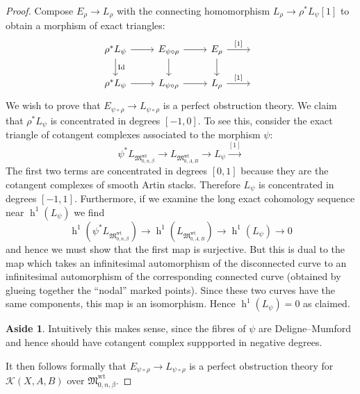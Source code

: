 \documentclass[11pt]{amsart}
\renewcommand{\to}{\rightarrow}
\newcommand{\MM}{\mathfrak M}
\newcommand{\Id}{\operatorname{Id}}
\newcommand{\h}{\operatorname{h}}
\theoremstyle{plain}
\theoremstyle{definition}
\newtheorem{aside}[thm]{Aside}
\begin{document}
\begin{proof} Compose $E_\rho \to L_\rho$ with the connecting homomorphism $L_\rho \to \rho^* L_\psi[1]$ to obtain a morphism of exact triangles:
\begin{equation} \label{E rho and E psi rho diagram}
\begin{tikzcd}
\rho^* L_\psi \ar[d,"\Id"] \ar[r] & E_{\psi \circ \rho} \ar[r] \ar[d] & E_\rho \ar[r,"{[1]}"] \ar[d] & \, \\
\rho^* L_\psi \ar[r] & L_{\psi \circ \rho} \ar[r] & L_\rho \ar[r,"{[1]}"] & \,
\end{tikzcd}
\end{equation}
We wish to prove that $E_{\psi \circ \rho} \to L_{\psi \circ \rho}$ is a perfect obstruction theory. We claim that $\rho^* L_{\psi}$ is concentrated in degrees $[-1,0]$. To see this, consider the exact triangle of cotangent complexes associated to the morphism $\psi$:
\begin{equation*} \psi^* L_{\MM_{0,n,\beta}^{\operatorname{wt}}} \to L_{\MM_{0,A,B}^{\operatorname{wt}}} \to L_\psi \xrightarrow{[1]} \end{equation*}
The first two terms are concentrated in degrees $[0,1]$ because they are the cotangent complexes of smooth Artin stacks. Therefore $L_\psi$ is concentrated in degrees $[-1,1]$. Furthermore, if we examine the long exact cohomology sequence near $\h^1(L_\psi)$ we find
\begin{equation*} \h^1(\psi^* L_{\MM_{0,n,\beta}^{\operatorname{wt}}}) \to \h^1(L_{\MM_{0,A,B}^{\operatorname{wt}}}) \to \h^1(L_\psi) \to 0 \end{equation*}
and hence we must show that the first map is surjective. But this is dual to the map which takes an infinitesimal automorphism of the disconnected curve to an infinitesimal automorphism of the corresponding connected curve (obtained by glueing together the ``nodal'' marked points). Since these two curves have the same components, this map is an isomorphism. Hence $\h^1(L_\psi) = 0$ as claimed.

\begin{aside} Intuitively this makes sense, since the fibres of $\psi$ are Deligne--Mumford and hence should have cotangent complex suppported in negative degrees. \end{aside}
It then follows formally that $E_{\psi \circ \rho} \to L_{\psi \circ \rho}$ is a perfect obstruction theory for $\mathcal{K}(X,A,B)$ over $\MM_{0,n,\beta}^{\operatorname{wt}}$. \end{proof}
\end{document}
